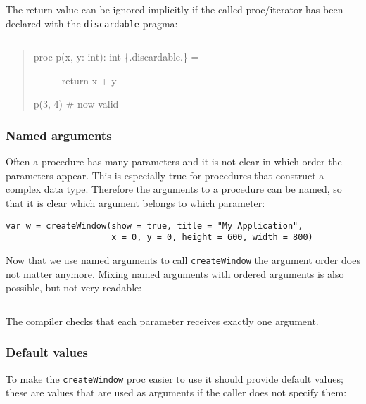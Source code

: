\begin{verbatim}
\end{verbatim}

The return value can be ignored implicitly if the called proc/iterator
has been declared with the \texttt{discardable} pragma:

\begin{verbatim}
\end{verbatim}

\begin{quote}
\begin{description}
\item[proc p(x, y: int): int \{.discardable.\} =]
return x + y
\end{description}

p(3, 4) \# now valid
\end{quote}

\hypertarget{named-arguments}{%
\subsubsection{Named arguments}\label{named-arguments}}

Often a procedure has many parameters and it is not clear in which order
the parameters appear. This is especially true for procedures that
construct a complex data type. Therefore the arguments to a procedure
can be named, so that it is clear which argument belongs to which
parameter:

\begin{verbatim}
var w = createWindow(show = true, title = "My Application",
                     x = 0, y = 0, height = 600, width = 800)
\end{verbatim}

Now that we use named arguments to call \texttt{createWindow} the
argument order does not matter anymore. Mixing named arguments with
ordered arguments is also possible, but not very readable:

\begin{verbatim}
\end{verbatim}

The compiler checks that each parameter receives exactly one argument.

\hypertarget{default-values}{%
\subsubsection{Default values}\label{default-values}}

To make the \texttt{createWindow} proc easier to use it should provide
{default values}; these are values that are used as arguments if the
caller does not specify them:

